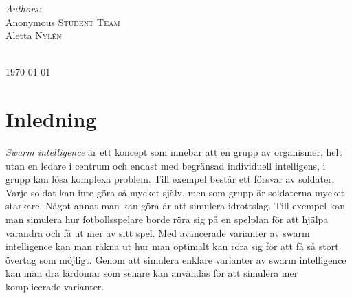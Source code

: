 \documentclass[12pt]{article}
\begin{document}
\begin{titlepage}

\begin{minipage}{0.6\textwidth}
\begin{flushleft} \large
\emph{Authors:}\\
Anonymous \textsc{Student Team}\\ %
Aletta \textsc{Nylén}\\ %
\end{flushleft}

\end{minipage}\\[2cm]



{\large \today}\\[2cm] %

\vfill %





\end{titlepage}
\tableofcontents
\newpage
\section{Inledning}
\textit{Swarm intelligence} är ett koncept som innebär att en grupp av organismer,
helt utan en ledare i centrum och endast med begränsad individuell intelligens, 
i grupp kan lösa komplexa problem.
Till exempel består ett försvar av soldater.
Varje soldat kan inte göra så mycket själv, men som grupp är soldaterna mycket starkare.
Något annat man kan göra är att simulera idrottslag.
Till exempel kan man simulera hur fotbollsspelare borde röra sig på en spelplan för att hjälpa varandra och få ut mer av sitt spel.
Med avancerade varianter av swarm intelligence kan man räkna ut hur man optimalt kan röra sig för att få så stort övertag som möjligt.
Genom att simulera enklare varianter av swarm intelligence kan man dra lärdomar som senare kan användas för att simulera mer komplicerade varianter.
\end{document}
